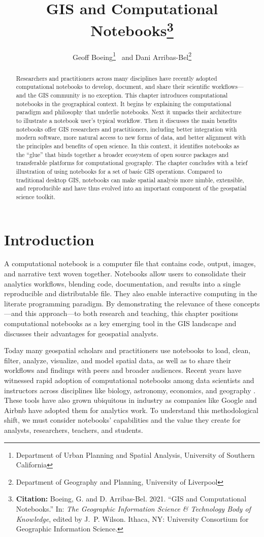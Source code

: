 \documentclass[11pt,letterpaper]{article}
\title{GIS and Computational Notebooks\footnote{\textbf{Citation:} Boeing, G. and D. Arribas-Bel. 2021. \enquote{GIS and Computational Notebooks.} In: \textit{The Geographic Information Science \& Technology Body of Knowledge}, edited by J.~P. Wilson. Ithaca, NY: University Consortium for Geographic Information Science.}}
\author{Geoff Boeing\thanks{Department of Urban Planning and Spatial Analysis, University of Southern California}~ and Dani Arribas-Bel\thanks{Department of Geography and Planning, University of Liverpool}}
\date{}
\makeatletter
\let\@fnsymbol\@arabic
\makeatother
\begin{document}
\maketitle
\makeatletter
\let\@fnsymbol\@fnsymbol
\makeatother

\begin{abstract}
Researchers and practitioners across many disciplines have recently adopted computational notebooks to develop, document, and share their scientific workflows---and the GIS community is no exception. This chapter introduces computational notebooks in the geographical context. It begins by explaining the computational paradigm and philosophy that underlie notebooks. Next it unpacks their architecture to illustrate a notebook user's typical workflow. Then it discusses the main benefits notebooks offer GIS researchers and practitioners, including better integration with modern software, more natural access to new forms of data, and better alignment with the principles and benefits of open science. In this context, it identifies notebooks as the \enquote{glue} that binds together a broader ecosystem of open source packages and transferable platforms for computational geography. The chapter concludes with a brief illustration of using notebooks for a set of basic GIS operations. Compared to traditional desktop GIS, notebooks can make spatial analysis more nimble, extensible, and reproducible and have thus evolved into an important component of the geospatial science toolkit.
\vspace{1cm}
\end{abstract}

\section{Introduction}

A computational notebook is a computer file that contains code, output, images, and narrative text woven together. Notebooks allow users to consolidate their analytics workflows, blending code, documentation, and results into a single reproducible and distributable file. They also enable interactive computing in the literate programming paradigm. By demonstrating the relevance of these concepts---and this approach---to both research and teaching, this chapter positions computational notebooks as a key emerging tool in the GIS landscape and discusses their advantages for geospatial analysts.

Today many geospatial scholars and practitioners use notebooks to load, clean, filter, analyze, visualize, and model spatial data, as well as to share their workflows and findings with peers and broader audiences. Recent years have witnessed rapid adoption of computational notebooks among data scientists and instructors across disciplines like biology, astronomy, economics, and geography \citep{perkel_why_2018}. These tools have also grown ubiquitous in industry as companies like Google and Airbnb have adopted them for analytics work. To understand this methodological shift, we must consider notebooks' capabilities and the value they create for analysts, researchers, teachers, and students.
\end{document}
